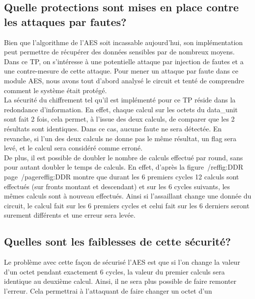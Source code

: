 \subsection{Quelle protections sont mises en place contre les attaques par fautes?}

Bien que l'algorithme de l'AES soit incassable aujourd'hui, son implémentation peut permettre de récupérer des données sensibles par de nombreux moyens.
Dans ce TP, on s'intéresse à une potentielle attaque par injection de fautes et a une contre-mesure de cette attaque.
Pour mener un attaque par faute  dans ce module AES, nous avons tout d'abord analysé le circuit et tenté de comprendre comment le système était protégé.\\

La sécurité du chiffrement tel qu'il est implémenté pour ce TP réside dans la redondance d'information.
En effet, chaque calcul sur les octets du data\_unit sont fait 2 fois, cela permet, à l'issue des deux calculs, de comparer que les 2 résultats sont identiques.
Dans ce cas, aucune faute ne sera détectée. En revanche, si l'un des deux calculs ne donne pas le même résultat, un flag sera levé, et le calcul sera considéré comme erroné.\\

De plus, il est possible de doubler le nombre de calculs effectué par round, sans pour autant doubler le temps de calculs.
En effet, d'après la figure~/ref{fig:DDR} page~/pageref{fig:DDR} montre que durant les 6 premiers cycles 12 calculs sont effectués (sur fronts montant et descendant)
et sur les 6 cycles suivants, les mêmes calculs sont à nouveau effectués.
Ainsi si l'assaillant change une donnée du circuit, le calcul fait sur les 6 premiers cycles et celui fait sur les 6 derniers seront surement différents et une erreur sera levée.


\subsection{Quelles sont les faiblesses de cette sécurité?}

Le problème avec cette façon de sécurisé l'AES est que si l'on change la valeur d'un octet pendant exactement 6 cycles, la valeur du premier calculs sera identique au deuxième calcul.
Ainsi, il ne sera plus possible de faire remonter l'erreur. Cela permettrai à l'attaquant de faire changer un octet d'un

